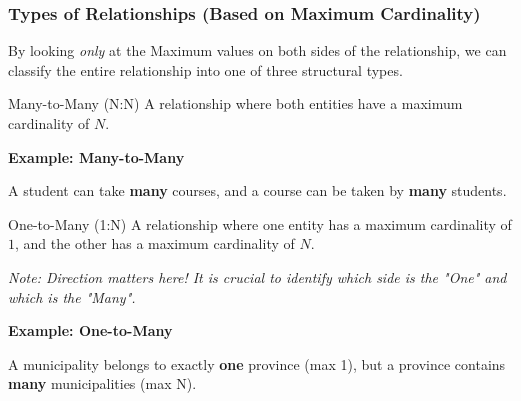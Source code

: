 \subsubsection{Types of Relationships (Based on Maximum Cardinality)}
By looking \textit{only} at the Maximum values on both sides of the relationship, we can classify the entire relationship into one of three structural types.


\begin{defbox}{Many-to-Many (N:N)}
A relationship where both entities have a maximum cardinality of $N$.
\end{defbox}

\vspace{0.2cm}
\begin{example}{\textbf{Example: Many-to-Many}}

    \vs
\begin{center}
\end{center}
A student can take \textbf{many} courses, and a course can be taken by \textbf{many} students.
\end{example}


\begin{defbox}{One-to-Many (1:N)}
A relationship where one entity has a maximum cardinality of $1$, and the other has a maximum cardinality of $N$.
\end{defbox}
\textit{Note: Direction matters here! It is crucial to identify which side is the "One" and which is the "Many".}

\vspace{0.2cm}
\begin{example}{\textbf{Example: One-to-Many}}

    \vs
\begin{center}
\end{center}
A municipality belongs to exactly \textbf{one} province (max 1), but a province contains \textbf{many} municipalities (max N).
\end{example}

